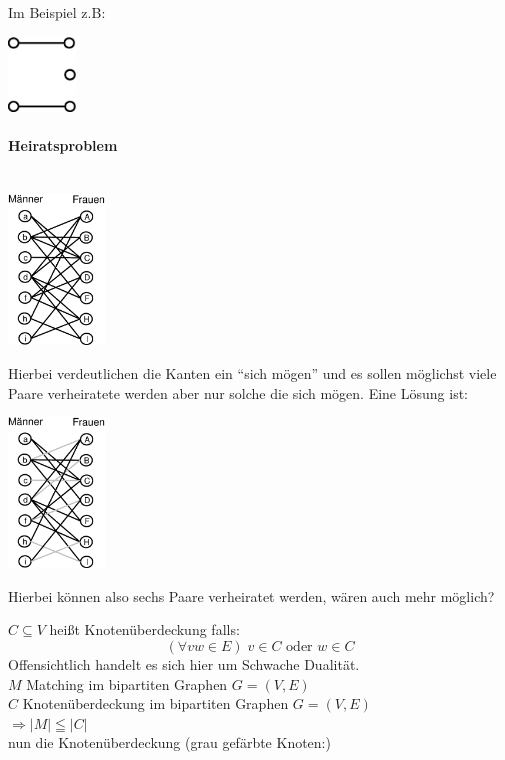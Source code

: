 Im Beispiel z.B: 

\includegraphics[height=2cm]{bilder/3-0BipMatch2}

\paragraph{Heiratsproblem} \mbox{}\\

\includegraphics[height=4cm]{bilder/3-0Heiraten}

Hierbei verdeutlichen die Kanten ein "`sich mögen"' und es sollen möglichst
viele Paare verheiratete werden aber nur solche die sich mögen. Eine Lösung
ist:

\includegraphics[height=4cm]{bilder/3-0Heiraten2}

Hierbei können also sechs Paare verheiratet werden, wären auch mehr
möglich?

$C \subseteq V$ heißt Knotenüberdeckung falls:
\[ (\forall v w \in E) \; v \in C \mbox{ oder }w \in C\]
Offensichtlich handelt es sich hier um Schwache Dualität.\\
$M$ Matching im bipartiten Graphen $G=(V,E)$\\
$C$ Knotenüberdeckung im bipartiten Graphen $G=(V,E)$\\
$\Rightarrow |M| \leqq |C|$\\

nun die Knotenüberdeckung (grau gefärbte Knoten:)

